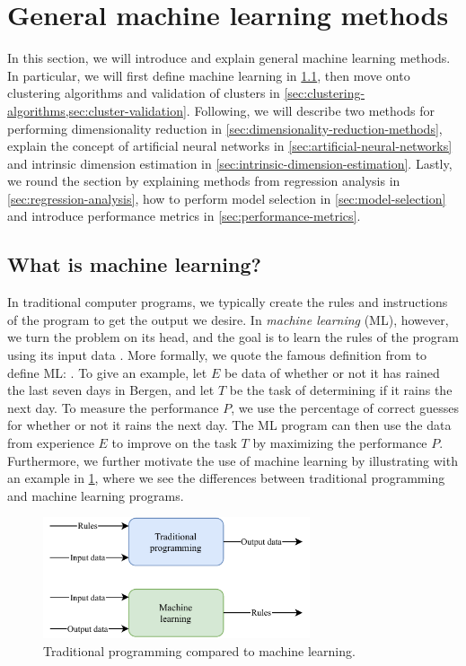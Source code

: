 \section{General machine learning methods}
In this section, we will introduce and explain general machine learning methods. In particular, we will first define machine learning in \cref{sec:what-is-machine-learning}, then move onto clustering algorithms and validation of clusters in \cref{sec:clustering-algorithms,sec:cluster-validation}. Following, we will describe two methods for performing dimensionality reduction in \cref{sec:dimensionality-reduction-methods}, explain the concept of artificial neural networks in \cref{sec:artificial-neural-networks} and intrinsic dimension estimation in \cref{sec:intrinsic-dimension-estimation}. Lastly, we round the section by explaining methods from regression analysis in \cref{sec:regression-analysis}, how to perform model selection in \cref{sec:model-selection} and introduce performance metrics in \cref{sec:performance-metrics}.

\subsection{What is machine learning?}
\label{sec:what-is-machine-learning}
In traditional computer programs, we typically create the rules and instructions of the program to get the output we desire. In \textit{machine learning} (ML), however, we turn the problem on its head, and the goal is to learn the rules of the program using its input data \cite{Mitchell1997}. More formally, we quote the famous definition from \cite[p. 2]{Mitchell1997} to define ML: . To give an example, let $E$ be data of whether or not it has rained the last seven days in Bergen, and let $T$ be the task of determining if it rains the next day. To measure the performance $P$, we use the percentage of correct guesses for whether or not it rains the next day. The ML program can then use the data from experience $E$ to improve on the task $T$ by maximizing the performance $P$. Furthermore, we further motivate the use of machine learning by illustrating with an example in \cref{fig:ml-versus-tradional-programming}, where we see the differences between traditional programming and machine learning programs.
\begin{figure}[H]
    \centering
    \includegraphics[width=0.7\textwidth]{thesis/figures/ml-versus-tradional-programming_cropped.pdf}
    \caption{Traditional programming compared to machine learning.}
    \label{fig:ml-versus-tradional-programming}
\end{figure}

